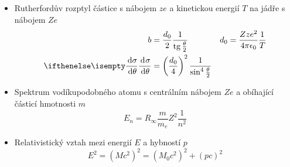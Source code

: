 \begin{itemize}
    \item Rutherfordův rozptyl částice s nábojem $ze$ a kinetickou energií $T$ na jádře s nábojem $Ze$
        \begin{align}
            b&=\frac{d_{0}}{2}\frac{1}{\tg{\frac{\theta}{2}}} & d_{0}&=\frac{Zze^{2}}{4\pi\epsilon_{0}}\frac{1}{T}\\
            \derivative{\sigma}{\theta}&=\left(\frac{d_{0}}{4}\right)^{2}\frac{1}{\sin^{4}{\frac{\theta}{2}}}
        \end{align}

    \item Spektrum vodíkupodobného atomu s centrálním nábojem $Ze$ a obíhající částicí hmotnosti $m$
        \begin{equation}
            E_{n}=R_{\infty}\frac{m}{m_{e}}Z^{2}\frac{1}{n^{2}}
        \end{equation}

    \item Relativistický vztah mezi energií $E$ a hybností $p$
        \begin{equation}
            E^{2}=\left(Mc^{2}\right)^{2}=\left(M_{0}c^{2}\right)^{2}+\left(pc\right)^{2}
        \end{equation}

\end{itemize}

